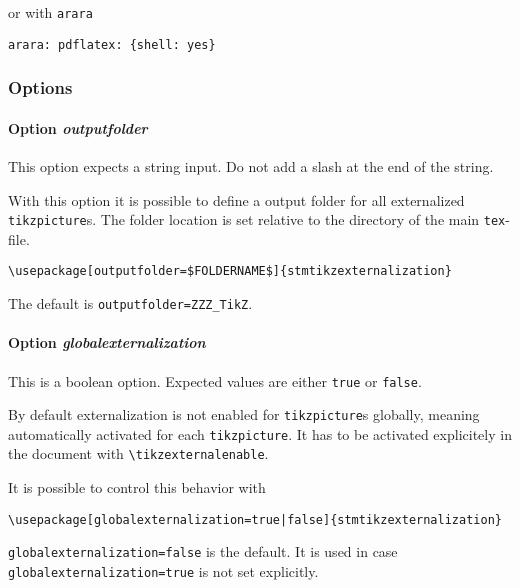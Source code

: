 \documentclass[%
  type=article,%
  layout=koma,%
  date=true,%
  hyperref=true,%
  listings=true,%
  tikz=false,%
]{stmtext}
\begin{document}
or with \verb+arara+

\begin{verbatim}
arara: pdflatex: {shell: yes}
\end{verbatim}

\subsubsection{Options}
\label{sec:usage:preamble:externalization:options}

\paragraph{Option \protect\textit{outputfolder}}
\label{sec:usage:preamble:externalization:options:outputfolder}

This option expects a string input. Do not add a slash at the end of the string.

With this option it is possible to define a output folder for all externalized \texttt{tikzpicture}s. The folder location is set relative to the directory of the main \texttt{tex}-file.

\begin{verbatim}
\usepackage[outputfolder=$FOLDERNAME$]{stmtikzexternalization}
\end{verbatim}

The default is \texttt{outputfolder=ZZZ\_TikZ}.

\paragraph{Option \protect\textit{globalexternalization}}
\label{sec:usage:preamble:wholepackage:options:globalexternalization}

This is a boolean option.  Expected values are either \texttt{true} or \texttt{false}. 

By default externalization is not enabled for \texttt{tikzpicture}s globally, meaning automatically activated for each \texttt{tikzpicture}. It has to be activated explicitely in the document with \texttt{\textbackslash tikzexternalenable}.

It is possible to control this behavior with 

\begin{verbatim}
\usepackage[globalexternalization=true|false]{stmtikzexternalization}
\end{verbatim}

\texttt{globalexternalization=false} is the default. It is used in case \texttt{globalexternalization=true} is not set explicitly.
\end{document}
